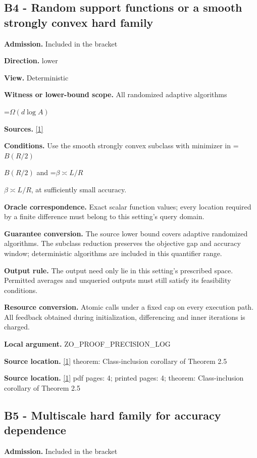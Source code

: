 \documentclass[10pt,a4paper]{article}
\newcommand{\AtlasMath}[1]{\par\begingroup\centering\setbox0=\hbox{$\displaystyle #1$}\ifdim\wd0>1.4\linewidth\typeout{ATLAS WIDE FORMULA: \the\wd0}\fi\ifdim\wd0>\linewidth\resizebox{\linewidth}{!}{\box0}\else\box0\fi\par\endgroup}
\newcommand{\AtlasInlineMath}[1]{\begingroup\setbox0=\hbox{$#1$}\ifdim\wd0>.4\linewidth\endgroup\AtlasMath{#1}\else\endgroup$#1$\fi}
\begin{document}
\subsection{B4 - Random support functions or a smooth strongly convex hard family}
\textbf{Admission.} Included in the bracket

\textbf{Direction.} lower

\textbf{View.} Deterministic

\textbf{Witness or lower-bound scope.} All randomized adaptive algorithms

\AtlasMath{\Omega(d\log A)}
\textbf{Sources.} \href{https://arxiv.org/html/2610.00345v1}{[1]}

\textbf{Conditions.} Use the smooth strongly convex subclass with minimizer in \AtlasInlineMath{B(R/2)} and \AtlasInlineMath{\beta \asymp L/R}, at sufficiently small accuracy.

\textbf{Oracle correspondence.} Exact scalar function values; every location required by a finite difference must belong to this setting's query domain.

\textbf{Guarantee conversion.} The source lower bound covers adaptive randomized algorithms. The subclass reduction preserves the objective gap and accuracy window; deterministic algorithms are included in this quantifier range.

\textbf{Output rule.} The output need only lie in this setting's prescribed space. Permitted averages and unqueried outputs must still satisfy its feasibility conditions.

\textbf{Resource conversion.} Atomic calls under a fixed cap on every execution path. All feedback obtained during initialization, differencing and inner iterations is charged.

\textbf{Local argument.} ZO\_\allowbreak{}PROOF\_\allowbreak{}PRECISION\_\allowbreak{}LOG

\textbf{Source location.} \href{https://arxiv.org/html/2610.00345v1}{[1]} theorem: Class-inclusion corollary of Theorem 2.5

\textbf{Source location.} \href{https://arxiv.org/html/2610.00345v1}{[1]} pdf pages: 4; printed pages: 4; theorem: Class-inclusion corollary of Theorem 2.5

\subsection{B5 - Multiscale hard family for accuracy dependence}
\textbf{Admission.} Included in the bracket
\end{document}
